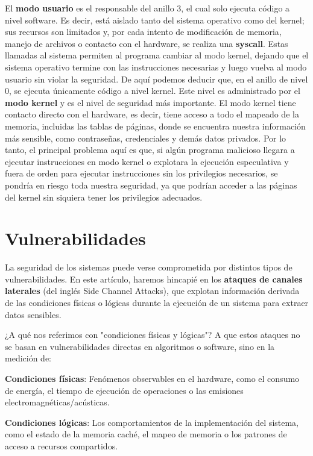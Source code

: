 \documentclass[lettersize,compsoc]{IEEEtran}
\begin{document}
El \textbf{modo usuario} es el responsable del anillo 3, el cual solo ejecuta código a nivel software. Es decir, está aislado tanto del sistema operativo como del kernel; sus recursos son limitados y, por cada intento de modificación de memoria, manejo de archivos o contacto con el hardware, se realiza una \textbf{syscall}. Estas llamadas al sistema permiten al programa cambiar al modo kernel, dejando que el sistema operativo termine con las instrucciones necesarias y luego vuelva al modo usuario sin violar la seguridad.
De aquí podemos deducir que, en el anillo de nivel 0, se ejecuta únicamente código a nivel kernel. Este nivel es administrado por el \textbf{modo kernel} y es el nivel de seguridad más importante. El modo kernel tiene contacto directo con el hardware, es decir, tiene acceso a todo el mapeado de la memoria, incluidas las tablas de páginas, donde se encuentra nuestra información más sensible, como contraseñas, credenciales y demás datos privados.
Por lo tanto, el principal problema aquí es que, si algún programa malicioso llegara a ejecutar instrucciones en modo kernel o explotara la ejecución especulativa y fuera de orden para ejecutar instrucciones sin los privilegios necesarios, se pondría en riesgo toda nuestra seguridad, ya que podrían acceder a las páginas del kernel sin siquiera tener los privilegios adecuados.

\section{Vulnerabilidades}

La seguridad de los sistemas puede verse comprometida por distintos tipos de vulnerabilidades. En este artículo, haremos hincapié en los \textbf{ataques de canales laterales} (del inglés Side Channel Attacks), que explotan información derivada de las condiciones físicas o lógicas durante la ejecución de un sistema para extraer datos sensibles.

¿A qué nos referimos con "condiciones físicas y lógicas"? A que estos ataques no se basan en vulnerabilidades directas en algoritmos o software, sino en la medición de:

    \textbf{Condiciones físicas}: Fenómenos observables en el hardware, como el consumo de energía, el tiempo de ejecución de operaciones o las emisiones electromagnéticas/acústicas.

    \textbf{Condiciones lógicas}: Los comportamientos de la implementación del sistema, como el estado de la memoria caché, el mapeo de memoria o los patrones de acceso a recursos compartidos.
\end{document}
